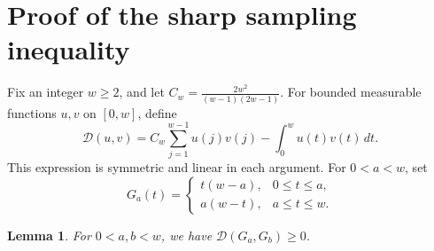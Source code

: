 \documentclass[reqno, 11pt]{article}
\numberwithin{equation}{section}
\newtheorem{lemma}[lemma]{Lemma}
\theoremstyle{definition}
\numberwithin{equation}{section}
\begin{document}
\appendix

\section{Proof of the sharp sampling inequality}
\label{q:proofsection}
Fix an integer $w\ge2$, and let
$C_w=\frac{2w^2}{(w-1)(2w-1)}$.
For bounded measurable functions $u,v$ on $[0,w]$, define
\[
\mathcal D(u,v)
=C_w\sum_{j=1}^{w-1}u(j)v(j)-\int_0^w u(t)v(t)\,dt.
\]
This expression is symmetric and linear in each argument.
For $0<a<w$, set
\[
G_a(t)=
\begin{cases}
t(w-a),&0\le t\le a,\\
a(w-t),&a\le t\le w.
\end{cases}
\]

\begin{lemma}\label{q:kernel}
For $0<a,b<w$, we have $\mathcal D(G_a,G_b)\ge0$.
\end{lemma}
\end{document}
